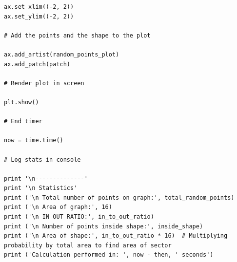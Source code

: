 \documentclass[11pt]{article}
\begin{document}
\begin{singlespace}
\begin{lstlisting}
ax.set_xlim((-2, 2))
ax.set_ylim((-2, 2))

# Add the points and the shape to the plot

ax.add_artist(random_points_plot)
ax.add_patch(patch)

# Render plot in screen

plt.show()

# End timer

now = time.time()

# Log stats in console

print '\n--------------'
print '\n Statistics'
print ('\n Total number of points on graph:', total_random_points)
print ('\n Area of graph:', 16)
print ('\n IN OUT RATIO:', in_to_out_ratio)
print ('\n Number of points inside shape:', inside_shape)
print ('\n Area of shape:', in_to_out_ratio * 16)  # Multiplying probability by total area to find area of sector
print ('Calculation performed in: ', now - then, ' seconds')

\end{lstlisting}
\end{singlespace}
\end{document}
